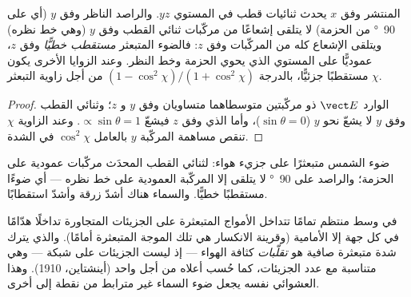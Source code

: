 \begin{proposition}\label{prop:b2:dipole-radiation:polarization}
 المنتشر وفق $x$ يحدث ثنائيات قطب في المستوي $yz$.
والراصد الناظر وفق $y$ (أي على \qty{90}{\degree} من الحزمة) لا يتلقى
إشعاعًا من مركّبات ثنائي القطب وفق $y$ (وهي خط نظره)
ويتلقى الإشعاع كله من المركّبات وفق $z$: فالضوء المتبعثر
\emph{مستقطب خطيًّا} وفق $z$، عموديًّا على المستوي
الذي يحوي الحزمة وخط النظر. وعند الزوايا الأخرى يكون
مستقطبًا جزئيًّا، بالدرجة $(1 - \cos^2\chi)/(1 + \cos^2\chi)$ من أجل
زاوية التبعثر $\chi$.
\end{proposition}

\begin{proof}
 الوارد $\vect E$ ذو مركّبتين متوسطاهما متساويان
وفق $y$ و $z$؛ وثنائي القطب وفق $y$ لا يشعّ نحو $y$ ($\sin
\theta = 0$)، وأما الذي وفق $z$ فيشعّ $\propto\sin\theta = 1$. وعند الزاوية $\chi$
تنقص مساهمة المركّبة $y$ بالعامل $\cos^2\chi$ في الشدة.
\end{proof}

\begin{omfigure}

{\small ضوء الشمس متبعثرًا على جزيء هواء: لثنائي القطب المحدَث
مركّبات عمودية على الحزمة؛ والراصد على \qty{90}{\degree}
لا يتلقى إلا المركّبة العمودية على خط نظره ---
أي ضوءًا مستقطبًا خطيًّا. والسماء هناك أشدّ زرقة وأشدّ استقطابًا.}
\end{omfigure}

\begin{remark}\label{rem:b2:dipole-radiation:why}
في وسط منتظم تمامًا تتداخل الأمواج المتبعثرة على الجزيئات
المتجاورة تداخلًا هدّامًا في كل جهة إلا الأمامية
(وقرينة الانكسار هي تلك الموجة المتبعثرة أمامًا). والذي
يترك شدة متبعثرة صافية هو \emph{تقلّبات} كثافة الهواء --- إذ
ليست الجزيئات على شبكة --- وهي متناسبة مع
عدد الجزيئات، كما حُسب أعلاه من أجل واحد (أينشتاين، 1910). وهذا
العشوائي نفسه يجعل ضوء السماء غير مترابط من نقطة إلى أخرى.
\end{remark}

